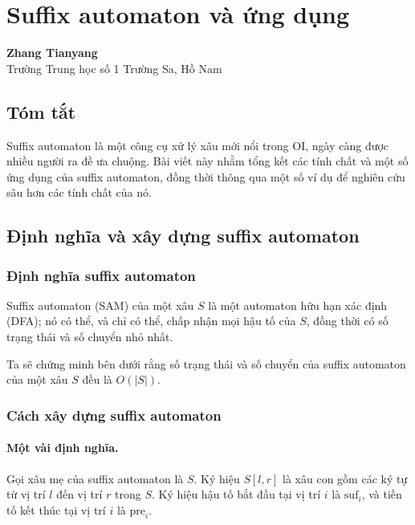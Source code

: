 \documentclass[11pt]{article}
\begin{document}
\section{Suffix automaton và ứng dụng}

\begin{center}
\textbf{Zhang Tianyang}\\
Trường Trung học số 1 Trường Sa, Hồ Nam
\end{center}

\subsection*{Tóm tắt}

Suffix automaton là một công cụ xử lý xâu mới nổi trong OI, ngày càng được
nhiều người ra đề ưa chuộng. Bài viết này nhằm tổng kết các tính chất và một
số ứng dụng của suffix automaton, đồng thời thông qua một số ví dụ để nghiên
cứu sâu hơn các tính chất của nó.

\subsection{Định nghĩa và xây dựng suffix automaton}

\subsubsection{Định nghĩa suffix automaton}

Suffix automaton (SAM) của một xâu \(S\) là một automaton hữu hạn xác định
(DFA); nó có thể, và chỉ có thể, chấp nhận mọi hậu tố của \(S\), đồng thời có
số trạng thái và số chuyển nhỏ nhất.

Ta sẽ chứng minh bên dưới rằng số trạng thái và số chuyển của suffix automaton
của một xâu \(S\) đều là \(O(|S|)\).

\subsubsection{Cách xây dựng suffix automaton}

\paragraph{Một vài định nghĩa.}
Gọi xâu mẹ của suffix automaton là \(S\). Ký hiệu \(S[l,r]\) là xâu con gồm các
ký tự từ vị trí \(l\) đến vị trí \(r\) trong \(S\). Ký hiệu hậu tố bắt đầu tại
vị trí \(i\) là \(\mathrm{suf}_i\), và tiền tố kết thúc tại vị trí \(i\) là
\(\mathrm{pre}_i\).
\end{document}
